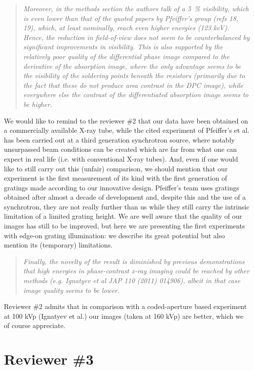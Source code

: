 \documentclass[a4paper,english]{scrartcl}
\newenvironment{reviewerquote}{\begin{quote}\itshape}{\end{quote}}
\begin{document}
\begin{reviewerquote}
    Moreover, in the methods section the authors talk of a
    \SI{5}{\percent} visibility, which is even lower than that of the quoted papers by Pfeiffer's group (refs 18, 19), which, at least nominally, reach even higher energies (123 keV). Hence, the reduction in field-of-view does not seem to be counterbalanced by significant improvements in visibility. This is also supported by the relatively poor quality of the differential phase image compared to the derivative of the absorption image, where the only advantage seems to be the visibility of the soldering points beneath the resistors (primarily due to the fact that these do not produce area contrast in the DPC image), while everywhere else the contrast of the differentiated absorption image seems to be higher.
\end{reviewerquote}
We would like to remind to the reviewer \#2 that our data have been obtained on
a commercially available X-ray tube, while the cited experiment of Pfeiffer's
et al. has been carried out at a third generation synchrotron source, where
notably unsurpassed beam conditions can be created which are far from what one
can expect in real life (i.e. with conventional X-ray tubes). And, even if one
would like to still carry out this (unfair) comparison, we should mention that
our experiment is the first measurement of its kind with the first generation
of gratings made according to our innovative design. Pfeiffer's team uses
gratings obtained after almost a decade of development and, despite this and
the use of a synchrotron, they are not really further than us while they still
carry the intrinsic limitation of a limited grating height. We are well aware
that the quality of our images has still to be improved, but here we are
presenting the first experiments with edge-on grating illumination: we describe
its great potential but also mention its (temporary) limitations.
\begin{reviewerquote}
Finally, the novelty of the result is diminished by previous demonstrations that high energies in phase-contrast x-ray imaging could be reached by other methods (e.g. Ignatyev et al JAP 110 (2011) 014906), albeit in that case image quality seems to be lower.     
\end{reviewerquote}
Reviewer \#2 admits that in comparison with a coded-aperture based experiment at 100 kVp (Ignatyev et al.) our images (taken at 160 kVp) are better, which we of course appreciate.

\section*{Reviewer \#3}
\end{document}
